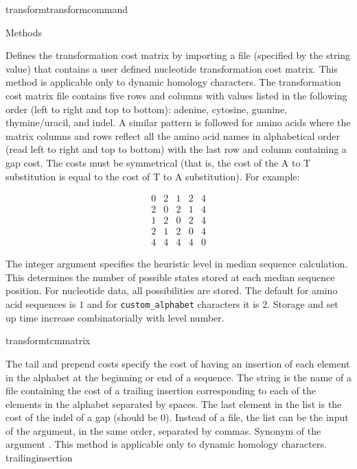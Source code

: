\begin{command}{transform}{transformcommand}
\begin{arguments}
\begin{argumentgroup}{Methods}
            {Defines the transformation cost matrix by importing a file (specified by
            the string value) that contains a user defined nucleotide
            transformation cost matrix. This method is applicable only to dynamic homology characters.
            The transformation cost matrix file contains five rows and columns
            with values listed in the following order (left to right and top to
            bottom): adenine, cytosine, guanine,
            thymine/uracil, and indel.  A similar pattern is followed for amino acids
            where the matrix columns and rows reflect all the amino acid names in alphabetical order
            (read left to right and top to bottom) with the last row and column containing a gap cost. 
            The costs must be symmetrical (that is, the
            cost of the A to T substitution is equal to the cost of T to A
            substitution). For example:

            \begin{equation*}
                \begin{array}{lllll}
                    0 &     2 &    1 &     2 &     4 \\
                    2 &     0 &    2 &     1 &     4 \\
                    1 &     2 &    0 &     2 &     4 \\
                    2 &     1 &    2 &     0 &     4 \\
                    4 &     4 &    4 &     4 &     0
                 \end{array}
            \end{equation*} 

            The integer argument specifies the heuristic level in median sequence 
            calculation.  This determines the number of possible states stored at 
            each median sequence position.  For nucleotide data, all possibilities 
            are stored.  The default for amino acid sequences is $1$ and for 
            \texttt{custom\_alphabet} characters it is $2$.  Storage and set up time 
            increase combinatorially with level number.}
            {transformtcmmatrix}

            {The tail and prepend costs specify the cost of having an insertion of
            each element in the alphabet at the beginning or end
            of a sequence. The string is the name of a file containing the cost of
            a trailing insertion corresponding to each of the elements
            in the alphabet separated by spaces. The last element in the list is the
            cost of the indel of a gap (should be 0). Instead of a file, the list can
            be the input of the argument, in the same order, separated by commas.
            Synonym of the argument . This method is applicable 
            only to dynamic homology characters.} 
            {trailinginsertion}


\end{argumentgroup}
\end{arguments}
\end{command}
